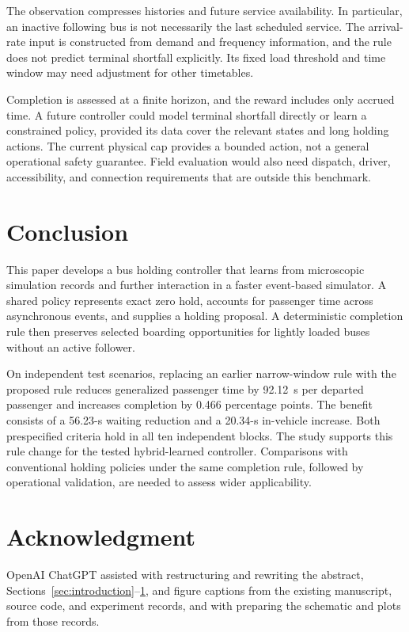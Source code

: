 \documentclass[letterpaper,journal]{IEEEtran}
\begin{document}
The observation compresses histories and future service availability. In particular, an inactive following bus is not necessarily the last scheduled service. The arrival-rate input is constructed from demand and frequency information, and the rule does not predict terminal shortfall explicitly. Its fixed load threshold and time window may need adjustment for other timetables.

Completion is assessed at a finite horizon, and the reward includes only accrued time. A future controller could model terminal shortfall directly or learn a constrained policy, provided its data cover the relevant states and long holding actions. The current physical cap provides a bounded action, not a general operational safety guarantee. Field evaluation would also need dispatch, driver, accessibility, and connection requirements that are outside this benchmark.

\section{Conclusion}
\label{sec:conclusion}
This paper develops a bus holding controller that learns from microscopic simulation records and further interaction in a faster event-based simulator. A shared policy represents exact zero hold, accounts for passenger time across asynchronous events, and supplies a holding proposal. A deterministic completion rule then preserves selected boarding opportunities for lightly loaded buses without an active follower.

On independent test scenarios, replacing an earlier narrow-window rule with the proposed rule reduces generalized passenger time by 92.12~s per departed passenger and increases completion by 0.466 percentage points. The benefit consists of a 56.23-s waiting reduction and a 20.34-s in-vehicle increase. Both prespecified criteria hold in all ten independent blocks. The study supports this rule change for the tested hybrid-learned controller. Comparisons with conventional holding policies under the same completion rule, followed by operational validation, are needed to assess wider applicability.

\section*{Acknowledgment}
OpenAI ChatGPT assisted with restructuring and rewriting the abstract, Sections~\ref{sec:introduction}--\ref{sec:conclusion}, and figure captions from the existing manuscript, source code, and experiment records, and with preparing the schematic and plots from those records.



\end{document}
